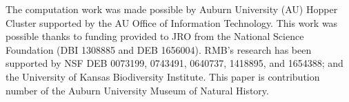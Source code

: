 The computation work was made possible by Auburn University (AU) Hopper Cluster
supported by the AU Office of Information Technology.
This work was possible thanks to funding provided to JRO from the National
Science Foundation (DBI 1308885 and DEB 1656004).
RMB's research has been supported by NSF DEB 0073199, 0743491, 0640737,
1418895, and 1654388; and the University of Kansas Biodiversity Institute.
This paper is contribution number  of the Auburn University
Museum of Natural History.
